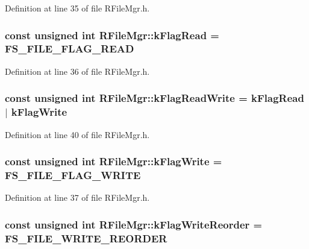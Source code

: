Definition at line 35 of file RFileMgr.h.\hypertarget{class_r_file_mgr_cf4103da9315f00f0ca524c2f263a1b4}{
\subsubsection[{kFlagRead}]{\setlength{\rightskip}{0pt plus 5cm}const unsigned int {\bf RFileMgr::kFlagRead} = FS\_\-FILE\_\-FLAG\_\-READ}}
\label{class_r_file_mgr_cf4103da9315f00f0ca524c2f263a1b4}




Definition at line 36 of file RFileMgr.h.\hypertarget{class_r_file_mgr_9c85e5ddcd9516e3b05e57b539cae3d9}{
\subsubsection[{kFlagReadWrite}]{\setlength{\rightskip}{0pt plus 5cm}const unsigned int {\bf RFileMgr::kFlagReadWrite} = {\bf kFlagRead} $|$ {\bf kFlagWrite}}}
\label{class_r_file_mgr_9c85e5ddcd9516e3b05e57b539cae3d9}




Definition at line 40 of file RFileMgr.h.\hypertarget{class_r_file_mgr_d50cfef45d5e20a1de1abc17c0691067}{
\subsubsection[{kFlagWrite}]{\setlength{\rightskip}{0pt plus 5cm}const unsigned int {\bf RFileMgr::kFlagWrite} = FS\_\-FILE\_\-FLAG\_\-WRITE}}
\label{class_r_file_mgr_d50cfef45d5e20a1de1abc17c0691067}




Definition at line 37 of file RFileMgr.h.\hypertarget{class_r_file_mgr_8b1ee35639a13fda3783e38664d747ba}{
\subsubsection[{kFlagWriteReorder}]{\setlength{\rightskip}{0pt plus 5cm}const unsigned int {\bf RFileMgr::kFlagWriteReorder} = FS\_\-FILE\_\-WRITE\_\-REORDER}}
\label{class_r_file_mgr_8b1ee35639a13fda3783e38664d747ba}




